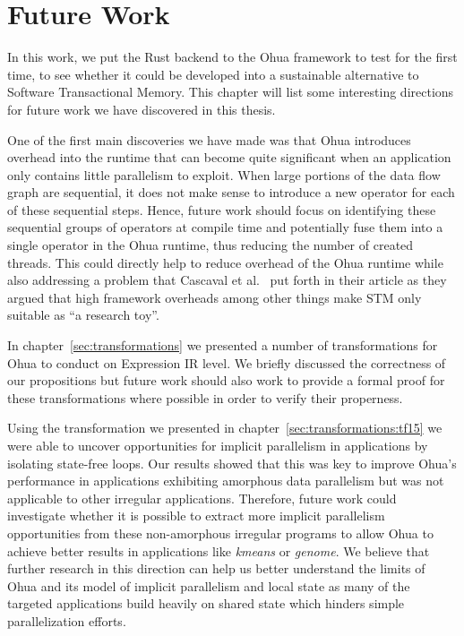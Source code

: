 %
\chapter{Future Work}
\label{sec:future}

In this work, we put the Rust backend to the Ohua framework to test for the first time, to see whether it could be developed into a sustainable alternative to Software Transactional Memory.
This chapter will list some interesting directions for future work we have discovered in this thesis.

One of the first main discoveries we have made was that Ohua introduces overhead into the runtime that can become quite significant when an application only contains little parallelism to exploit.
When large portions of the data flow graph are sequential, it does not make sense to introduce a new operator for each of these sequential steps.
Hence, future work should focus on identifying these sequential groups of operators at compile time and potentially fuse them into a single operator in the Ohua runtime, thus reducing the number of created threads.
This could directly help to reduce overhead of the Ohua runtime while also addressing a problem that Cascaval et al.~\cite{cascaval2008software} put forth in their article as they argued that high framework overheads among other things make STM only suitable as \enquote{a research toy}.

In chapter~\ref{sec:transformations} we presented a number of transformations for Ohua to conduct on Expression IR level.
We briefly discussed the correctness of our propositions but future work should also work to provide a formal proof for these transformations where possible in order to verify their properness.

Using the transformation we presented in chapter~\ref{sec:transformations:tf15} we were able to uncover opportunities for implicit parallelism in applications by isolating state-free loops.
Our results showed that this was key to improve Ohua's performance in applications exhibiting amorphous data parallelism but was not applicable to other irregular applications.
Therefore, future work could investigate whether it is possible to extract more implicit parallelism opportunities from these non-amorphous irregular programs to allow Ohua to achieve better results in applications like \emph{kmeans} or \emph{genome}.
We believe that further research in this direction can help us better understand the limits of Ohua and its model of implicit parallelism and local state as many of the targeted applications build heavily on shared state which hinders simple parallelization efforts.

